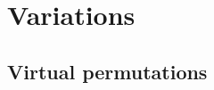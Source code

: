 \documentclass[12pt]%
{amsart}
\renewcommand\S{{\mathcal S}}
\newcommand{\la}{{\lambda}}
\newcommand{\si}{{\sigma}}
\newcommand{\om}{{\omega}}
\def\red#1{{\color{red}{#1}}}
\theoremstyle{plain}
\theoremstyle{definition}
\theoremstyle{remark}
\newcommand{\ve}{\varepsilon}
\begin{document}



\section{Variations}\label{sec:variations}

\subsection{Virtual permutations} 
\end{document}
